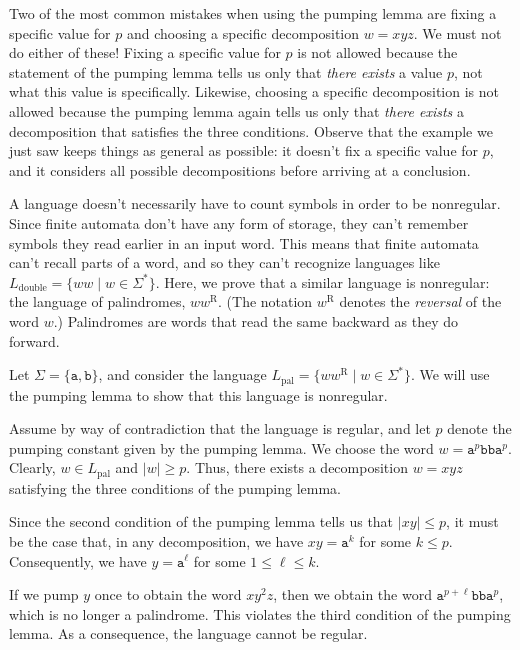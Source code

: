 \begin{dangerous}
Two of the most common mistakes when using the pumping lemma are fixing a specific value for $p$ and choosing a specific decomposition $w = xyz$. We must not do either of these! Fixing a specific value for $p$ is not allowed because the statement of the pumping lemma tells us only that \emph{there exists} a value $p$, not what this value is specifically. Likewise, choosing a specific decomposition is not allowed because the pumping lemma again tells us only that \emph{there exists} a decomposition that satisfies the three conditions. Observe that the example we just saw keeps things as general as possible: it doesn't fix a specific value for $p$, and it considers all possible decompositions before arriving at a conclusion.
\end{dangerous}

A language doesn't necessarily have to count symbols in order to be nonregular. Since finite automata don't have any form of storage, they can't remember symbols they read earlier in an input word. This means that finite automata can't recall parts of a word, and so they can't recognize languages like $L_{\text{double}} = \{ww \mid w \in \Sigma^{*}\}$. Here, we prove that a similar language is nonregular: the language of palindromes, $ww^{\text{R}}$. (The notation $w^{\text{R}}$ denotes the \emph{reversal} of the word $w$.) Palindromes are words that read the same backward as they do forward.

\begin{example}
Let $\Sigma = \{\texttt{a}, \texttt{b}\}$, and consider the language $L_{\text{pal}} = \{ ww^{\text{R}} \mid w \in \Sigma^{*}\}$. We will use the pumping lemma to show that this language is nonregular.

Assume by way of contradiction that the language is regular, and let $p$ denote the pumping constant given by the pumping lemma. We choose the word $w = \texttt{a}^{p}\texttt{bb}\texttt{a}^{p}$. Clearly, $w \in L_{\text{pal}}$ and $|w| \geq p$. Thus, there exists a decomposition $w = xyz$ satisfying the three conditions of the pumping lemma.

Since the second condition of the pumping lemma tells us that $|xy| \leq p$, it must be the case that, in any decomposition, we have $xy = \texttt{a}^{k}$ for some $k \leq p$. Consequently, we have $y = \texttt{a}^{\ell}$ for some $1 \leq \ell \leq k$.

If we pump $y$ once to obtain the word $xy^{2}z$, then we obtain the word $\texttt{a}^{p+\ell}\texttt{bb}\texttt{a}^{p}$, which is no longer a palindrome. This violates the third condition of the pumping lemma. As a consequence, the language cannot be regular.
\end{example}

